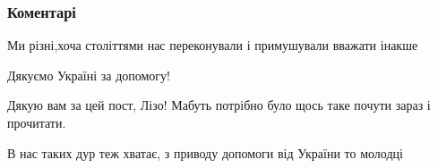  
 
 
 
 
\subsubsection{Коментарі}
\label{sec:06_08_2021.fb.bielskaja_elizaveta.1.my_ne_odin_narod.cmt}

\begin{itemize}
 
Ми різні,хоча століттями нас переконували і примушували вважати інакше

 
Дякуємо Україні за допомогу!

 
Дякую вам за цей пост, Лізо! Мабуть потрібно було щось таке почути зараз і прочитати. 💛💙

 
В нас таких дур теж хватає, з приводу допомоги від України то молодці

 

\end{itemize}
